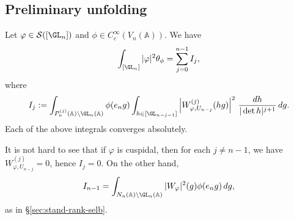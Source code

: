 \subsection{Preliminary unfolding}


\begin{proposition}\label{prop:sub-gln:let-varphi-in-preilm-unfold}
  Let $\varphi \in \mathcal{S}([\GL_n])$ and $\phi \in C_c^\infty(V_n(\mathbb{A}))$.  We have
  \begin{equation}\label{eq:int-_gl_n-varphi2}
    \int_{[\GL_n]} |\varphi|^2 \theta_\phi  =
    \sum_{j=0}^{n-1} I_j,
  \end{equation}
  where
  \begin{equation}\label{eq:cullblm1fm}
    I_j := \int_{P_n^{(j)}(\mathbb{A}) \backslash \GL_n(\mathbb{A})} \phi(e_n g)
    \int_{h \in [\GL_{n-j-1}]}
    \left\lvert
      W_{\varphi,U_{n-j}}^{(j)} (h g)
    \right\rvert^2
    \, \frac{d h}{|\det h|^{j+1}}
    \, d g.
  \end{equation}
  Each of the above integrals converges absolutely.
\end{proposition}
\begin{remark}
  It is not hard to see that if $\varphi$ is cuspidal, then for each $j \neq n-1$, we have $W_{\varphi,U_{n-j}}^{(j)} = 0$, hence $I_j = 0$.  On the other hand,
  \begin{equation*}
    I_{n-1} = \int_{N_n(\mathbb{A}) \backslash \GL_n(\mathbb{A})} |W_{\varphi}|^2(g) \phi(e_n g) \, d g,
  \end{equation*}
  as in \S\ref{sec:stand-rank-selb}.
\end{remark}

